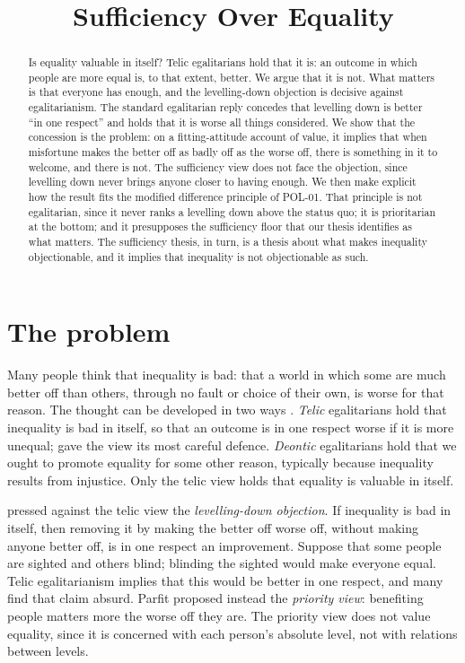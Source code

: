 \documentclass{situationist-preprint}
\title{Sufficiency Over Equality}
\begin{document}
\maketitle

\begin{abstract}
Is equality valuable in itself? Telic egalitarians hold that it is: an outcome in which people are more equal is, to that extent, better. We argue that it is not. What matters is that everyone has enough, and the levelling-down objection is decisive against egalitarianism. The standard egalitarian reply concedes that levelling down is better \enquote{in one respect} and holds that it is worse all things considered. We show that the concession is the problem: on a fitting-attitude account of value, it implies that when misfortune makes the better off as badly off as the worse off, there is something in it to welcome, and there is not. The sufficiency view does not face the objection, since levelling down never brings anyone closer to having enough. We then make explicit how the result fits the modified difference principle of POL-01. That principle is not egalitarian, since it never ranks a levelling down above the status quo; it is prioritarian at the bottom; and it presupposes the sufficiency floor that our thesis identifies as what matters. The sufficiency thesis, in turn, is a thesis about what makes inequality objectionable, and it implies that inequality is not objectionable as such.
\end{abstract}

\section{The problem}

Many people think that inequality is bad: that a world in which some are much better off than others, through no fault or choice of their own, is worse for that reason. The thought can be developed in two ways \citep{Parfit1997}. \emph{Telic} egalitarians hold that inequality is bad in itself, so that an outcome is in one respect worse if it is more unequal; \citet{Temkin1993} gave the view its most careful defence. \emph{Deontic} egalitarians hold that we ought to promote equality for some other reason, typically because inequality results from injustice. Only the telic view holds that equality is valuable in itself.

\citet{Parfit1997} pressed against the telic view the \emph{levelling-down objection}. If inequality is bad in itself, then removing it by making the better off worse off, without making anyone better off, is in one respect an improvement. Suppose that some people are sighted and others blind; blinding the sighted would make everyone equal. Telic egalitarianism implies that this would be better in one respect, and many find that claim absurd. Parfit proposed instead the \emph{priority view}: benefiting people matters more the worse off they are. The priority view does not value equality, since it is concerned with each person's absolute level, not with relations between levels.
\end{document}
